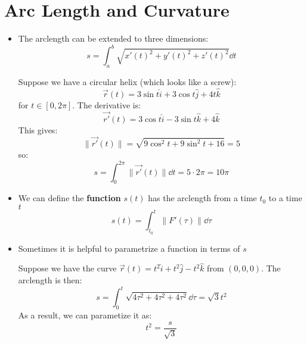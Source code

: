 \section{Arc Length and Curvature}
\begin{itemize}
    \item The arclength can be extended to three dimensions:
    \begin{equation}
        s = \int_a^b \sqrt{x'(t)^2 + y'(t)^2 + z'(t)^2} \dd{t}
    \end{equation}
    \begin{example}
        Suppose we have a circular helix (which looks like a screw):
        \begin{equation}
            \vec{r}(t) = 3\sin t \hat{i} + 3\cos t\hat{j} + 4t\hat{k}
        \end{equation}
        for $t \in [0, 2\pi]$. The derivative is:
        \begin{equation}
            \vec{r'}(t) = 3\cos t \hat{i} - 3\sin t\hat{k} + 4\hat{k}
        \end{equation}
        This gives:
        \begin{equation}
            \lVert \vec{r'}(t) \rVert = \sqrt{9\cos^2 t + 9\sin^2 t + 16} = 5
        \end{equation}
        so:
        \begin{equation}
            s = \int_0^{2\pi} \lVert \vec{r'}(t) \rVert \dd{t} = 5 \cdot 2\pi = 10\pi
        \end{equation}
    \end{example}
    \item We can define the \textbf{function} $s(t)$ has the arclength from a time $t_0$ to a time $t$
    \begin{equation}
        s(t) = \int_{t_0}^t \lVert F'(\tau) \rVert \dd{\tau}
    \end{equation}
    \item Sometimes it is helpful to parametrize a function in terms of $s$
    \begin{example}
        Suppose we have the curve $\vec{r}(t) = t^2 \hat{i} + t^2\hat{j} - t^2\hat{k}$ from $(0,0,0)$. The arclength is then:
        \begin{equation}
            s = \int_0^t \sqrt{4\tau^2+4\tau^2+4\tau^2} \dd{\tau} = \sqrt{3}t^2
        \end{equation}
        As a result, we can parametize it as:
        \begin{equation}
            t^2 = \frac{s}{\sqrt{3}}

\end{equation}
\end{example}
\end{itemize}

